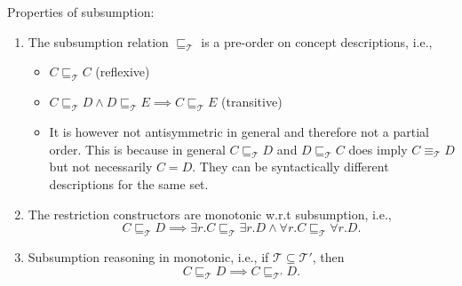 \begin{lemma}
	Properties of subsumption:
	\begin{enumerate}
		\item The subsumption relation $\sqsubseteq_{\mathcal{T}}$ is a pre-order on concept descriptions, i.e.,
			\begin{itemize}
				\item $C \sqsubseteq_{\mathcal{T}}C$ (reflexive)
				\item $C \sqsubseteq_{\mathcal{T}} D \land D \sqsubseteq_{\mathcal{T}} E \implies C \sqsubseteq_{\mathcal{T}} E$ (transitive)
				\item It is however not antisymmetric in general and therefore not a partial order.
					This is because in general $C \sqsubseteq_{\mathcal{T}} D$ and $D \sqsubseteq_{\mathcal{T}} C$
					does imply $C \equiv_{\mathcal{T}} D$ but not necessarily $C = D$.
					They can be syntactically different descriptions for the same set.
			\end{itemize}
		\item The restriction constructors are monotonic w.r.t subsumption, i.e.,
			\[
			C \sqsubseteq_{\mathcal{T}} D \implies \exists r.C \sqsubseteq_{\mathcal{T}} \exists r.D \land \forall r.C \sqsubseteq_{\mathcal{T}} \forall r.D
			.\] 
		\item Subsumption reasoning in monotonic, i.e., if $\mathcal{T} \subseteq  \mathcal{T}'$, then
			\[
				C \sqsubseteq_{\mathcal{T}} D \implies C \sqsubseteq_{\mathcal{T}'} D
			.\] 
	\end{enumerate}
\end{lemma}
